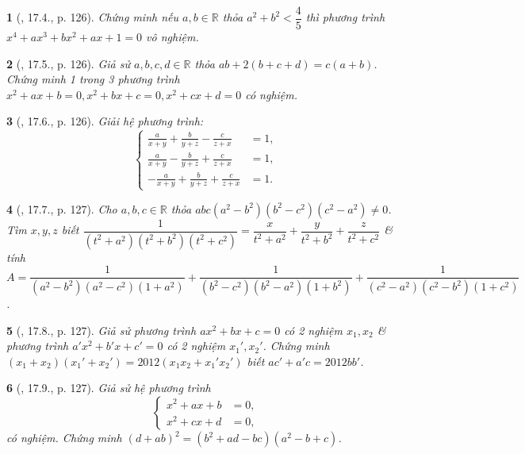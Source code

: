 \documentclass{article}
\newtheorem{baitoan}{}
\begin{document}
\begin{baitoan}[\cite{TLCT_THCS_Toan_9_dai_so}, 17.4., p. 126]
	Chứng minh nếu $a,b\in\mathbb{R}$ thỏa $a^2 + b^2 < \dfrac{4}{5}$ thì phương trình $x^4 + ax^3 + bx^2 + ax + 1 = 0$ vô nghiệm.
\end{baitoan}

\begin{baitoan}[\cite{TLCT_THCS_Toan_9_dai_so}, 17.5., p. 126]
	Giả sử $a,b,c,d\in\mathbb{R}$ thỏa $ab + 2(b + c + d) = c(a + b)$. Chứng minh 1 trong 3 phương trình $x^2 + ax + b = 0,x^2 + bx + c = 0,x^2 + cx + d = 0$ có nghiệm.
\end{baitoan}

\begin{baitoan}[\cite{TLCT_THCS_Toan_9_dai_so}, 17.6., p. 126]
	Giải hệ phương trình:
	\begin{equation*}
		\left\{\begin{split}
			\frac{a}{x + y} + \frac{b}{y + z} - \frac{c}{z + x} &= 1,\\
			\frac{a}{x + y} - \frac{b}{y + z} + \frac{c}{z + x} &= 1,\\
			-\frac{a}{x + y} + \frac{b}{y + z} + \frac{c}{z + x} &= 1.
		\end{split}\right.
	\end{equation*}
\end{baitoan}

\begin{baitoan}[\cite{TLCT_THCS_Toan_9_dai_so}, 17.7., p. 127]
	Cho $a,b,c\in\mathbb{R}$ thỏa $abc(a^2 - b^2)(b^2 - c^2)(c^2 - a^2)\ne0$. Tìm $x,y,z$ biết $\dfrac{1}{(t^2 + a^2)(t^2 + b^2)(t^2 + c^2)} = \dfrac{x}{t^2 + a^2} + \dfrac{y}{t^2 + b^2} + \dfrac{z}{t^2 + c^2}$ \& tính $A = \dfrac{1}{(a^2 - b^2)(a^2 - c^2)(1 + a^2)} + \dfrac{1}{(b^2 - c^2)(b^2 - a^2)(1 + b^2)} + \dfrac{1}{(c^2 - a^2)(c^2 - b^2)(1 + c^2)}$.
\end{baitoan}

\begin{baitoan}[\cite{TLCT_THCS_Toan_9_dai_so}, 17.8., p. 127]
	Giả sử phương trình $ax^2 + bx + c = 0$ có 2 nghiệm $x_1,x_2$ \& phương trình $a'x^2 + b'x + c' = 0$ có 2 nghiệm $x_1',x_2'$. Chứng minh $(x_1 + x_2)(x_1' + x_2') = 2012(x_1x_2 + x_1'x_2')$ biết $ac' + a'c = 2012bb'$.
\end{baitoan}

\begin{baitoan}[\cite{TLCT_THCS_Toan_9_dai_so}, 17.9., p. 127]
	Giả sử hệ phương trình
	\begin{equation*}
		\left\{\begin{split}
			x^2 + ax + b &= 0,\\
			x^2 + cx + d &= 0,
		\end{split}\right.
	\end{equation*}
	có nghiệm. Chứng minh $(d + ab)^2 = (b^2 + ad - bc)(a^2 - b + c)$.
\end{baitoan}
\end{document}
